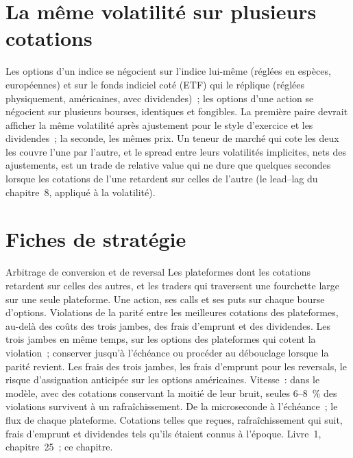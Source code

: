 \section{La même volatilité sur plusieurs cotations}

Les options d'un indice se négocient sur l'indice lui-même (réglées en espèces, européennes) et sur le fonds indiciel coté (ETF) qui le réplique (réglées physiquement, américaines, avec
dividendes)~; les options d'une action se négocient sur plusieurs bourses, identiques et fongibles. La première paire devrait afficher la même volatilité après ajustement
pour le style d'exercice et les dividendes~; la seconde, les mêmes prix. Un teneur de marché qui cote les deux les couvre l'une par l'autre, et le spread entre leurs
volatilités implicites, nets des ajustements, est un trade de relative value qui ne dure que quelques secondes lorsque les cotations de l'une retardent sur celles de l'autre
(le lead--lag du chapitre~8, appliqué à la volatilité).

\section{Fiches de stratégie}

\begin{strategyfile}{Arbitrage de conversion et de reversal}\label{strat:hf:options-cross-venue-and-volatility-arbitrage-at-speed:conversion}
 Les plateformes dont les cotations retardent sur celles des autres, et les traders qui traversent une fourchette large sur une seule plateforme.
 Une action, ses calls et ses puts sur chaque bourse d'options.
 Violations de la parité entre les meilleures cotations des plateformes, au-delà des coûts des trois jambes, des frais d'emprunt et des dividendes.
 Les trois jambes en même temps, sur les options des plateformes qui cotent la violation~; conserver jusqu'à l'échéance ou procéder au débouclage lorsque la parité revient.
 Les frais des trois jambes, les frais d'emprunt pour les reversals, le risque d'assignation anticipée sur les options américaines.
 Vitesse~: dans le modèle, avec des cotations conservant la moitié de leur bruit, seules 6--8~\% des violations survivent à un rafraîchissement.
 De la microseconde à l'échéance~; le flux de chaque plateforme.
 Cotations telles que reçues, rafraîchissement qui suit, frais d'emprunt et dividendes tels qu'ils étaient connus à l'époque.
 Livre~1, chapitre~25~; ce chapitre.
\end{strategyfile}

